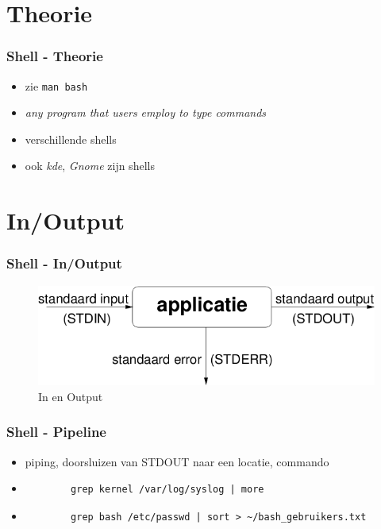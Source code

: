 \documentclass{beamer}
\begin{document}
\section{Theorie}
\begin{frame}
  \frametitle{Shell - Theorie}
  \begin{itemize}
    \item<1-> zie \texttt{man bash}
    \item<2-> \emph{any program that users employ to type commands}
    \item<3-> verschillende shells
    \item<4-> ook \emph{kde}, \emph{Gnome} zijn shells
  \end{itemize}
\end{frame}

\section{In/Output}
\begin{frame}
  \frametitle{Shell - In/Output}
  \begin{figure}[H]
    \begin{center}
      \includegraphics[scale=0.5]{images/inout}
    \end{center}
    \caption{In en Output}
    \label{fig:output}
  \end{figure}
\end{frame}

\begin{frame}[fragile]
  \frametitle{Shell - Pipeline}
  \begin{itemize}
    \item<1-> piping, doorsluizen van STDOUT naar een locatie, commando
    \item<2->
      \begin{lstlisting}
        grep kernel /var/log/syslog | more 
      \end{lstlisting}
    \item<3->
      \begin{lstlisting}
        grep bash /etc/passwd | sort > ~/bash_gebruikers.txt
      \end{lstlisting}
  \end{itemize}
\end{frame}
\end{document}
